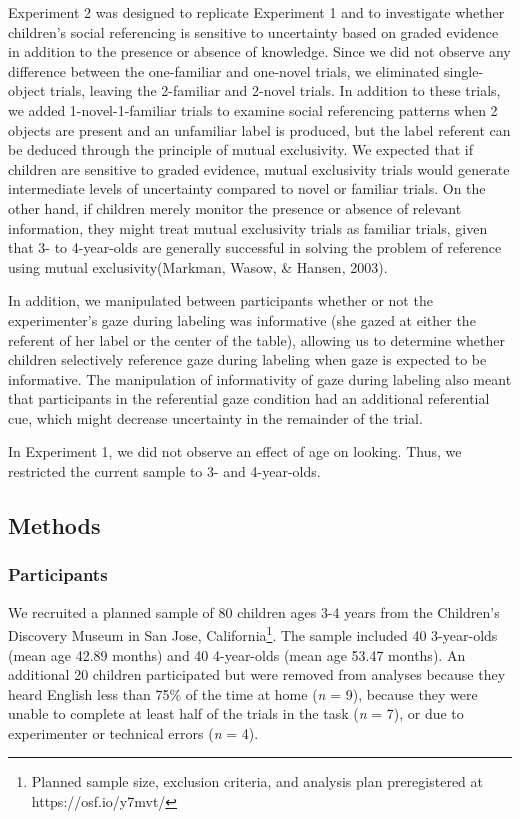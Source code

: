 \documentclass[10pt, letterpaper]{article}
\begin{document}
Experiment 2 was designed to replicate Experiment 1 and to investigate
whether children's social referencing is sensitive to uncertainty based
on graded evidence in addition to the presence or absence of knowledge.
Since we did not observe any difference between the one-familiar and
one-novel trials, we eliminated single-object trials, leaving the
2-familiar and 2-novel trials. In addition to these trials, we added
1-novel-1-familiar trials to examine social referencing patterns when 2
objects are present and an unfamiliar label is produced, but the label
referent can be deduced through the principle of mutual exclusivity. We
expected that if children are sensitive to graded evidence, mutual
exclusivity trials would generate intermediate levels of uncertainty
compared to novel or familiar trials. On the other hand, if children
merely monitor the presence or absence of relevant information, they
might treat mutual exclusivity trials as familiar trials, given that 3-
to 4-year-olds are generally successful in solving the problem of
reference using mutual exclusivity(Markman, Wasow, \& Hansen, 2003).

In addition, we manipulated between participants whether or not the
experimenter's gaze during labeling was informative (she gazed at either
the referent of her label or the center of the table), allowing us to
determine whether children selectively reference gaze during labeling
when gaze is expected to be informative. The manipulation of
informativity of gaze during labeling also meant that participants in
the referential gaze condition had an additional referential cue, which
might decrease uncertainty in the remainder of the trial.

In Experiment 1, we did not observe an effect of age on looking. Thus,
we restricted the current sample to 3- and 4-year-olds.

\subsection{Methods}\label{methods-1}

\subsubsection{Participants}\label{participants-1}

We recruited a planned sample of 80 children ages 3-4 years from the
Children's Discovery Museum in San Jose,
California\footnote{Planned sample size, exclusion criteria, and analysis plan preregistered at https://osf.io/y7mvt/}.
The sample included 40 3-year-olds (mean age 42.89 months) and 40
4-year-olds (mean age 53.47 months). An additional 20 children
participated but were removed from analyses because they heard English
less than 75\% of the time at home (\emph{n} = 9), because they were
unable to complete at least half of the trials in the task (\emph{n} =
7), or due to experimenter or technical errors (\emph{n} = 4).
\end{document}
